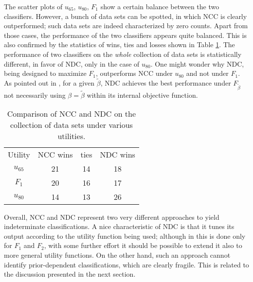 \documentclass[a4paper,10pt,reqno]{amsart}
\theoremstyle{remark}
\begin{document}
The scatter plots of $u_{65}$, $u_{80}$, $F_1$ show a certain balance between the two classifiers. However, a bunch of data sets can be spotted, in which NCC is clearly outperformed; such data sets are indeed characterized by zero counts. 
Apart from those cases,  the performance of the two classifiers appears quite balanced. This is also confirmed by the statistics of wins, ties and losses shown in Table \ref{tab:ncc-nnd}. The performance of two classifiers on  the \textit{whole} collection of data sets is statistically different, in favor of NDC,  only in the case of $u_{80}$. One might wonder why NDC, being designed to maximize $F_1$, outperforms NCC under $u_{80}$ and not under $F_1$. As pointed out in \cite{JdalCozlearning}, for a given $\tilde{\beta}$,  NDC achieves the best performance under $F_{\tilde{\beta}}$  not necessarily using $\beta=\tilde{\beta}$ within its internal objective function.

\begin{table}[!ht]
\begin{centering}
\begin{tabular}{cccc}\toprule
Utility  & NCC wins&  ties & NDC wins\\ \cmidrule(r){1-4}
$u_{65}$  & 21 & 14 & 18  \tabularnewline
$F_1$ & 20 & 16 & 17 \\ 
$u_{80}$  & 14 & 13 & 26  \\ \bottomrule%
\end{tabular}
\par\end{centering}
\caption{\label{tab:ncc-nnd} Comparison of NCC and NDC on the collection of data sets under various utilities.}
\end{table}

Overall, NCC and NDC represent two very different approaches to yield indeterminate classifications. A nice characteristic of NDC is that it tunes its output according to 
the utility function being used; although in \cite{JdalCozlearning} this is done only for $F_1$ and $F_2$,  with some further effort it should be possible to  extend it also to more general utility functions. On the other hand, such an approach cannot identify prior-dependent classifications, which are clearly fragile. This is related to the discussion presented in the next section.
\end{document}

